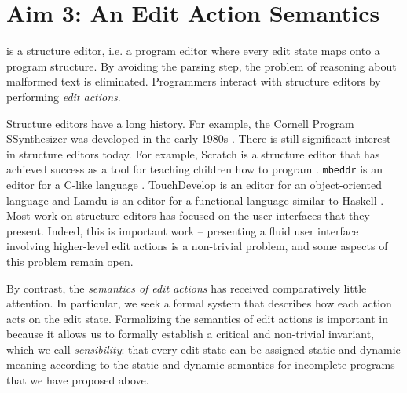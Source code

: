 \section{Aim 3: An Edit Action Semantics}\label{sec:actions}

\HazelEnv is a structure editor, i.e. a 
program editor where every edit state maps onto a program structure. By
avoiding the parsing step, the problem of reasoning about malformed text is
eliminated.  Programmers interact with structure editors by performing
\emph{edit actions}.

Structure editors have a long history. For example, the Cornell Program
SSynthesizer was developed in the early 1980s \cite{teitelbaum_cornell_1981}. There is still significant   
 interest in structure editors today. For example,  Scratch is a 
structure editor that has achieved success as a tool for teaching children
how to program \cite{Resnick:2009:SP:1592761.1592779}. \texttt{mbeddr} is an editor for a C-like
language \cite{voelter_mbeddr:_2012}. TouchDevelop is an editor for an
object-oriented language \cite{tillmann_touchdevelop:_2011} and Lamdu is an
editor for a functional language similar to Haskell \cite{lamdu}. Most work on structure editors has focused on the user
interfaces that they present. Indeed, this is important work -- presenting a
fluid user interface involving higher-level edit actions is a non-trivial
problem, and some aspects of this problem remain open.

By contrast, the \emph{semantics of edit actions} has received comparatively little
attention. In particular, we seek a formal system that describes how each action acts on the edit
state. 
Formalizing the semantics of edit actions is important in \HazelEnv
because it allows us to formally establish a critical and non-trivial invariant,
which we call \emph{sensibility}: that every edit state can be assigned static
and dynamic meaning according to the static and dynamic semantics for incomplete
programs that we have proposed above. 


